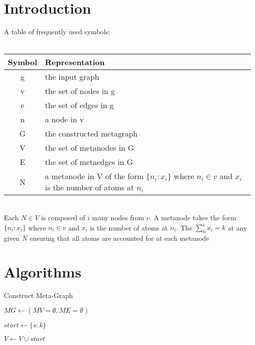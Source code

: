 \documentclass{article}
\begin{document}
    \section{Introduction}
    \label{sec:Introduction}
        A table of frequently used symbols: \\ \\
        \begin{tabular}{cl}
            \textbf{Symbol} & \textbf{Representation} \\
            \hline
            g & the input graph \\
            v & the set of nodes in g \\
            e & the set of edges in g \\
            n & a node in v \\
            G & the constructed metagraph \\
            V & the set of metanodes in G \\
            E & the set of metaedges in G \\
            N & a metanode in V of the form $\{n_i:x_i\}$ where $n_i \in v$ and
            $x_i$ is the number of atoms at $n_i$\\
            \hline
        \end{tabular} \\

        Each $N \in V$ is composed of $i$ many nodes from $v$. A
        metanode takes the form $\{n_i:x_i\}$ where $n_i \in v$ and $x_i$ is
        the number of atoms at $n_i$. The $\sum_0^i x_i = k$ at any given $N$
        ensuring that all atoms are accounted for at each metanode

    \section{Algorithms}
    \label{sec:Algorithms}

        \begin{algorithm}
            \caption{Construct Meta-Graph}

            $MG \gets (MV = \emptyset, ME = \emptyset)$ 

            $start \gets \{s:k\}$ 

            $V \gets V \cup start$ 

        \end{algorithm}

        \begin{algorithm}
            \caption{}
            \KwIn{}
            \KwOut{}

        \end{algorithm}
\end{document}
